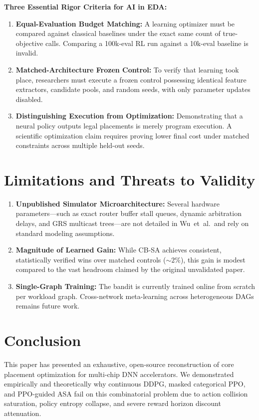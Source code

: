 \documentclass[10pt,conference]{IEEEtran}
\begin{document}
\textbf{Three Essential Rigor Criteria for AI in EDA:}\
\begin{enumerate}
  \item \textbf{Equal-Evaluation Budget Matching:} A learning optimizer must be compared against classical baselines under the exact same count of true-objective calls. Comparing a 100k-eval RL run against a 10k-eval baseline is invalid.
  \item \textbf{Matched-Architecture Frozen Control:} To verify that learning took place, researchers must execute a frozen control possessing identical feature extractors, candidate pools, and random seeds, with only parameter updates disabled.
  \item \textbf{Distinguishing Execution from Optimization:} Demonstrating that a neural policy outputs legal placements is merely program execution. A scientific optimization claim requires proving lower final cost under matched constraints across multiple held-out seeds.
\end{enumerate}

\section{Limitations and Threats to Validity}
\label{sec:limitations}
\begin{enumerate}
  \item \textbf{Unpublished Simulator Microarchitecture:} Several hardware parameters—such as exact router buffer stall queues, dynamic arbitration delays, and GRS multicast trees—are not detailed in Wu~et~al.\ and rely on standard modeling assumptions.
  \item \textbf{Magnitude of Learned Gain:} While CB-SA achieves consistent, statistically verified wins over matched controls (${\sim}2\%$), this gain is modest compared to the vast headroom claimed by the original unvalidated paper.
  \item \textbf{Single-Graph Training:} The bandit is currently trained online from scratch per workload graph. Cross-network meta-learning across heterogeneous DAGs remains future work.
\end{enumerate}

\section{Conclusion}
\label{sec:conclusion}
This paper has presented an exhaustive, open-source reconstruction of core placement optimization for multi-chip DNN accelerators. We demonstrated empirically and theoretically why continuous DDPG, masked categorical PPO, and PPO-guided ASA fail on this combinatorial problem due to action collision saturation, policy entropy collapse, and severe reward horizon discount attenuation. 
\end{document}
